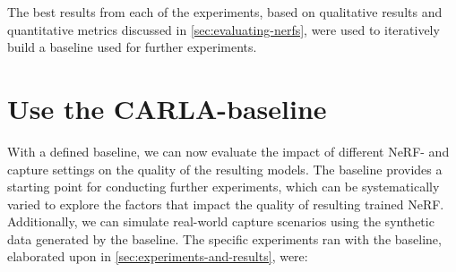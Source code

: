 The best results from each of the experiments, based on qualitative results and quantitative metrics discussed in \autoref{sec:evaluating-nerfs}, were used to iteratively build a baseline used for further experiments.
















\section{Use the CARLA-baseline}
\begin{comment}
Premise: Have a CARLA-baseline for further experiments
Question: Which further experiments should I conduct?

\begin{itemize}
    \item Find the efficiency of pose refinement
\end{itemize}
\end{comment}

With a defined baseline, we can now evaluate the impact of different NeRF- and capture settings on the quality of the resulting models. The baseline provides a starting point for conducting further experiments, which can be systematically varied to explore the factors that impact the quality of resulting trained NeRF. Additionally, we can simulate real-world capture scenarios using the synthetic data generated by the baseline. The specific experiments ran with the baseline, elaborated upon in \autoref{sec:experiments-and-results}, were:

